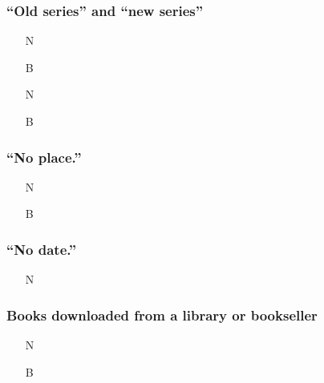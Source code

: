 \documentclass[11pt,letterpaper,oneside]{article}
\begin{document}
\setcounter{subsubsection}{131}
\subsubsection{``Old series'' and ``new series''}
\label{14.132}

\begin{itemize}
\item[N] 

\item[B] 

\item[N] 

\item[B] 
\end{itemize}

\setcounter{subsubsection}{137}
\subsubsection{``No place.''}

\begin{itemize}
\item[N] 

\item[B] 
\end{itemize}

\setcounter{subsubsection}{151}
\subsubsection{``No date.''}

\begin{itemize}
\item[N] 
\end{itemize}

\setcounter{subsubsection}{165}
\subsubsection{Books downloaded from a library or bookseller}

\begin{itemize}
\item[N] 

\item[B] 
\end{itemize}
\end{document}

